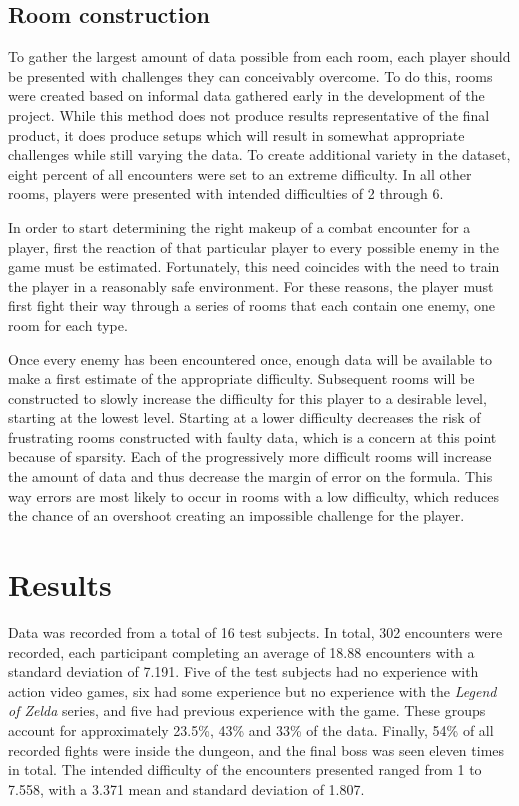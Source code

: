 \documentclass[a4paper]{article}
\begin{document}
\begin{multicols*}{2}
\subsection{Room construction} \label{roomconstruction}
To gather the largest amount of data possible from each room, each player should be presented with challenges they can conceivably overcome. To do this, rooms were created based on informal data gathered early in the development of the project. While this method does not produce results representative of the final product, it does produce setups which will result in somewhat appropriate challenges while still varying the data. To create additional variety in the dataset, eight percent of all encounters were set to an extreme difficulty. In all other rooms, players were presented with intended difficulties of 2 through 6.

In order to start determining the right makeup of a combat encounter for a player, first the reaction of that particular player to every possible enemy in the game must be estimated. Fortunately, this need coincides with the need to train the player in a reasonably safe environment. For these reasons, the player must first fight their way through a series of rooms that each contain one enemy, one room for each type. 

Once every enemy has been encountered once, enough data will be available to make a first estimate of the appropriate difficulty. Subsequent rooms will be constructed to slowly increase the difficulty for this player to a desirable level, starting at the lowest level. Starting at a lower difficulty decreases the risk of frustrating rooms constructed with faulty data, which is a concern at this point because of sparsity. Each of the progressively more difficult rooms will increase the amount of data and thus decrease the margin of error on the formula. This way errors are most likely to occur in rooms with a low difficulty, which reduces the chance of an overshoot creating an impossible challenge for the player.

\section{Results} \label{results} %
Data was recorded from a total of 16 test subjects. In total, 302 encounters were recorded, each participant completing an average of 18.88 encounters with a standard deviation of 7.191. Five of the test subjects had no experience with action video games, six had some experience but no experience with the \emph{Legend of Zelda} series, and five had previous experience with the game. These groups account for approximately 23.5\%, 43\% and 33\% of the data. Finally, 54\% of all recorded fights were inside the dungeon, and the final boss was seen eleven times in total. The intended difficulty of the encounters presented ranged from 1 to 7.558, with a 3.371 mean and standard deviation of 1.807.


\end{multicols*}
\end{document}
